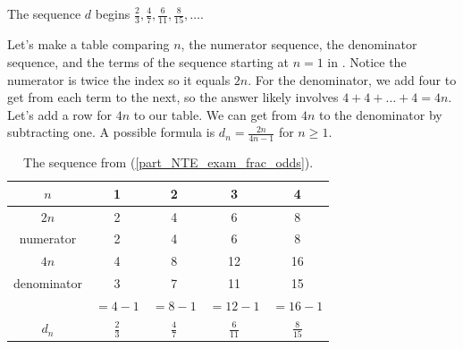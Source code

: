 \begin{exam}
\begin{apart}
            \item \label{part_NTE_exam_frac_odds} The sequence $d$ begins $\frac{2}{3}, \frac{4}{7}, \frac{6}{11}, \frac{8}{15}, \ldots$.  
                \begin{soln}
                    Let's make a table comparing $n$, the numerator sequence, the denominator sequence, and the terms of the sequence starting at $n=1$ in . Notice the numerator is twice the index so it equals $2n$.  For the denominator, we add four to get from each term to the next, so the answer likely involves $4+4+\ldots +4 = 4n$.  Let's add a row for $4n$ to our table.  We can get from $4n$ to the denominator by subtracting one.  A possible formula is $d_n = \frac{2n}{4n-1}$ for $n \ge 1$.
                \end{soln}
                \begin{table}[hbtp]
                    \centering
                    \begin{tabular}{c|c|c| c|c}
                        $n$ & 1 & 2 & 3 & 4   \\ \hline
                        $2n$ & 2 & 4 & 6 & 8\\  \hline
                        numerator & 2 & 4 & 6 & 8\\  \hline
                        $4n$ & 4 & 8 & 12 & 16 \\ \hline
                        denominator & 3 & 7 & 11 & 15\\ 
                        & $=4-1$ & $=8-1$ & $=12-1$ & $=16-1$\\ \hline
                        $d_n$ & $\frac{2}{3}$ & $ \frac{4}{7}$ & $ \frac{6}{11}$ & $ \frac{8}{15}$\\
                    \end{tabular}
                    \caption{The sequence from  (\ref{part_NTE_exam_frac_odds}).}
                    \label{tab_NTE_exam_frac_odds}
                \end{table}
                

\end{apart}
\end{exam}
